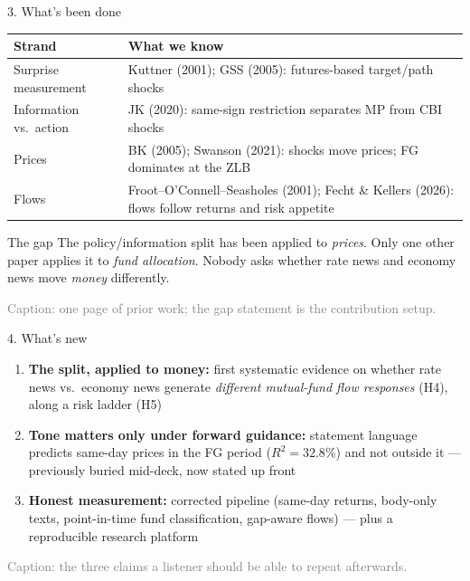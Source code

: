 \documentclass[aspectratio=169, 11pt]{beamer}
\newenvironment{ablock}[1]{\begin{block}{#1}}{\end{block}}
\begin{document}
\begin{frame}{3. What's been done}
  \footnotesize
  \begin{tabularx}{\textwidth}{l X}
    \toprule
    \textbf{Strand} & \textbf{What we know} \\
    \midrule
    Surprise measurement & Kuttner (2001); GSS (2005): futures-based target/path shocks \\
    Information vs.\ action & JK (2020): same-sign restriction separates MP from CBI shocks \\
    Prices & BK (2005); Swanson (2021): shocks move prices; FG dominates at the ZLB \\
    Flows & Froot--O'Connell--Seasholes (2001); Fecht \& Kellers (2026): flows follow returns and risk appetite \\
    \bottomrule
  \end{tabularx}
  \vspace{0.4em}
  \begin{ablock}{The gap}
    The policy/information split has been applied to \emph{prices}. Only one other paper applies it to
    \emph{fund allocation}. Nobody asks whether rate news and economy news move \emph{money} differently.
  \end{ablock}
  {\scriptsize\textcolor{gray}{Caption: one page of prior work; the gap statement is the contribution setup.}}
\end{frame}

\begin{frame}{4. What's new}
  \begin{enumerate}
    \item \textbf{The split, applied to money:} first systematic evidence on whether rate news vs.\ economy news
          generate \emph{different mutual-fund flow responses} (H4), along a risk ladder (H5)
    \item \textbf{Tone matters only under forward guidance:} statement language predicts same-day prices in the
          FG period ($R^2 = 32.8\%$) and not outside it --- previously buried mid-deck, now stated up front
    \item \textbf{Honest measurement:} corrected pipeline (same-day returns, body-only texts, point-in-time fund
          classification, gap-aware flows) --- plus a reproducible research platform
  \end{enumerate}
  {\scriptsize\textcolor{gray}{Caption: the three claims a listener should be able to repeat afterwards.}}
\end{frame}
\end{document}
